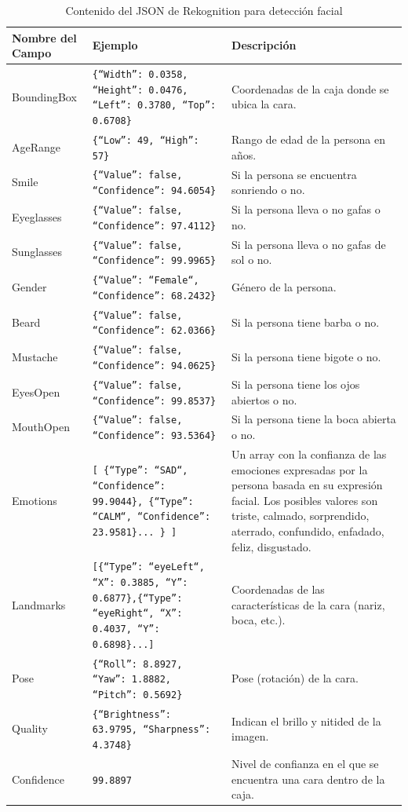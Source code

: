 \begin{table}[H]
    \centering
    \begin{tabular}{|p{}|p{}|p{}|}
    \hline
    Nombre del Campo & Ejemplo & Descripción \\ \hline
    BoundingBox & \texttt{\{``Width'': 0.0358, ``Height'': 0.0476, ``Left'': 0.3780, ``Top'': 0.6708\}} & Coordenadas de la caja donde se ubica la cara. \\ \hline
    AgeRange & \texttt{\{``Low'': 49, ``High'': 57\}} & Rango de edad de la persona en años. \\ \hline
    Smile & \texttt{\{``Value'': false, ``Confidence'': 94.6054\}} & Si la persona se encuentra sonriendo o no. \\ \hline
    Eyeglasses & \texttt{\{``Value'': false, ``Confidence'': 97.4112\}} & Si la persona lleva o no gafas o no. \\ \hline
    Sunglasses & \texttt{\{``Value'': false, ``Confidence'': 99.9965\}} & Si la persona lleva o no gafas de sol o no. \\ \hline
    Gender & \texttt{\{``Value'': ``Female``, ``Confidence'': 68.2432\}} & Género de la persona. \\ \hline
    Beard & \texttt{\{``Value'': false, ``Confidence'': 62.0366\}} & Si la persona tiene barba o no. \\ \hline
    Mustache & \texttt{\{``Value'': false, ``Confidence'': 94.0625\}} & Si la persona tiene bigote o no. \\ \hline
    EyesOpen & \texttt{\{``Value'': false, ``Confidence'': 99.8537\}} & Si la persona tiene los ojos abiertos o no. \\ \hline
    MouthOpen & \texttt{\{``Value'': false, ``Confidence'': 93.5364\}} & Si la persona tiene la boca abierta o no. \\ \hline
    Emotions & \texttt{{[} \{``Type'': ``SAD``, ``Confidence'': 99.9044\}, \{``Type'': ``CALM``, ``Confidence'': 23.9581\}... \} {]}} & Un array con la confianza de las emociones expresadas por la persona basada en su expresión facial. Los posibles valores son triste, calmado, sorprendido, aterrado, confundido, enfadado, feliz, disgustado. \\ \hline
    Landmarks & \texttt{{[}\{``Type'': ``eyeLeft``, ``X'': 0.3885, ``Y'': 0.6877\},\{``Type'': ``eyeRight``, ``X'': 0.4037, ``Y'': 0.6898\}...{]}} & Coordenadas de las características de la cara (nariz, boca, etc.). \\ \hline
    Pose & \texttt{\{``Roll'': 8.8927, ``Yaw'': 1.8882, ``Pitch'': 0.5692\}} & Pose (rotación) de la cara. \\ \hline
    Quality & \texttt{\{``Brightness'': 63.9795, ``Sharpness'': 4.3748\}} & Indican el brillo y nitided de la imagen. \\ \hline
    Confidence & \texttt{99.8897} & Nivel de confianza en el que se encuentra una cara dentro de la caja. \\ \hline
    \end{tabular}
    \caption{Contenido del JSON de Rekognition para detección facial}
    \label{tab:json_rekognition}
\end{table}

